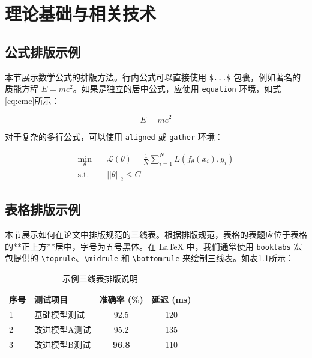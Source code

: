 \chapter{理论基础与相关技术}
\label{chap:theory}

\section{公式排版示例}
本节展示数学公式的排版方法。行内公式可以直接使用 \verb|$...$| 包裹，例如著名的质能方程 $E = mc^2$。如果是独立的居中公式，应使用 \verb|equation| 环境，如式\ref{eq:emc}所示：

\begin{equation}
    E = mc^2
    \label{eq:emc}
\end{equation}

对于复杂的多行公式，可以使用 \verb|aligned| 或 \verb|gather| 环境：

\begin{equation}
    \begin{aligned}
        \min_{\theta} \quad & \mathcal{L}(\theta) = \frac{1}{N} \sum_{i=1}^{N} L(f_\theta(x_i), y_i) \\
        \text{s.t.} \quad & ||\theta||_2 \leq C
    \end{aligned}
\end{equation}

\section{表格排版示例}
本节展示如何在论文中排版规范的三线表。根据排版规范，表格的表题应位于表格的**正上方**居中，字号为五号黑体。在 LaTeX 中，我们通常使用 \verb|booktabs| 宏包提供的 \verb|\toprule|、\verb|\midrule| 和 \verb|\bottomrule| 来绘制三线表。如表\ref{tab:sample_table}所示：

\begin{table}[htbp]
    \centering
    \caption{示例三线表排版说明}
    \label{tab:sample_table}
    \begin{tabular}{llcc}
        \toprule
        \textbf{序号} & \textbf{测试项目} & \textbf{准确率 (\%)} & \textbf{延迟 (ms)} \\
        \midrule
        1 & 基础模型测试 & 92.5 & 120 \\
        2 & 改进模型A测试 & 95.2 & 135 \\
        3 & 改进模型B测试 & \textbf{96.8} & 110 \\
        \bottomrule
    \end{tabular}
\end{table}

